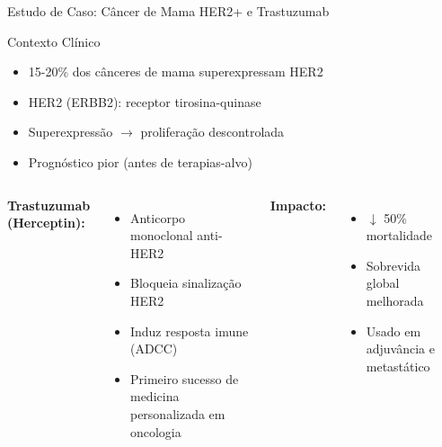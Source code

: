 \begin{frame}{Estudo de Caso: Câncer de Mama HER2+ e Trastuzumab}
\begin{block}{Contexto Clínico}
\begin{itemize}
    \item 15-20\% dos cânceres de mama superexpressam HER2
    \item HER2 (ERBB2): receptor tirosina-quinase
    \item Superexpressão $\rightarrow$ proliferação descontrolada
    \item Prognóstico pior (antes de terapias-alvo)
\end{itemize}
\end{block}

\vspace{0.3cm}

\begin{columns}
\textbf{Trastuzumab (Herceptin):}
\begin{itemize}
    \item Anticorpo monoclonal anti-HER2
    \item Bloqueia sinalização HER2
    \item Induz resposta imune (ADCC)
    \item Primeiro sucesso de medicina personalizada em oncologia
\end{itemize}

\vspace{0.3cm}

\textbf{Impacto:}
\begin{itemize}
    \item $\downarrow$ 50\% mortalidade
    \item Sobrevida global melhorada
    \item Usado em adjuvância e metastático
\end{itemize}

\begin{center}
\end{center}
\end{columns}
\end{frame}
